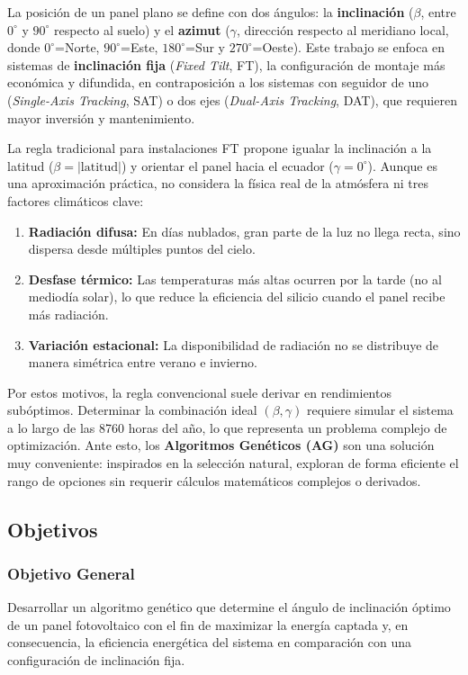 \documentclass[12pt, a4paper, twocolumn]{article}
\begin{document}
La posición de un panel plano se define con dos ángulos: la \textbf{inclinación} ($\beta$, entre $0^\circ$ y $90^\circ$ respecto al suelo) y el \textbf{azimut} ($\gamma$, dirección respecto al meridiano local, donde $0^\circ$=Norte, $90^\circ$=Este, $180^\circ$=Sur y $270^\circ$=Oeste). Este trabajo se enfoca en sistemas de \textbf{inclinación fija} (\textit{Fixed Tilt}, FT), la configuración de montaje más económica y difundida, en contraposición a los sistemas con seguidor de uno (\textit{Single-Axis Tracking}, SAT) o dos ejes (\textit{Dual-Axis Tracking}, DAT), que requieren mayor inversión y mantenimiento.

La regla tradicional para instalaciones FT propone igualar la inclinación a la latitud ($\beta = |\text{latitud}|$) y orientar el panel hacia el ecuador ($\gamma = 0^\circ$). Aunque es una aproximación práctica, no considera la física real de la atmósfera ni tres factores climáticos clave:
\begin{enumerate}
    \item \textbf{Radiación difusa:} En días nublados, gran parte de la luz no llega recta, sino dispersa desde múltiples puntos del cielo.
    \item \textbf{Desfase térmico:} Las temperaturas más altas ocurren por la tarde (no al mediodía solar), lo que reduce la eficiencia del silicio cuando el panel recibe más radiación.
    \item \textbf{Variación estacional:} La disponibilidad de radiación no se distribuye de manera simétrica entre verano e invierno.
\end{enumerate}

Por estos motivos, la regla convencional suele derivar en rendimientos subóptimos. Determinar la combinación ideal $(\beta, \gamma)$ requiere simular el sistema a lo largo de las 8760 horas del año, lo que representa un problema complejo de optimización. Ante esto, los \textbf{Algoritmos Genéticos (AG)} son una solución muy conveniente: inspirados en la selección natural, exploran de forma eficiente el rango de opciones sin requerir cálculos matemáticos complejos o derivados.

\subsection{Objetivos}

\subsubsection{Objetivo General}
Desarrollar un algoritmo genético que determine el ángulo de inclinación óptimo de un panel fotovoltaico con el fin de maximizar la energía captada y, en consecuencia, la eficiencia energética del sistema en comparación con una configuración de inclinación fija.
\end{document}
